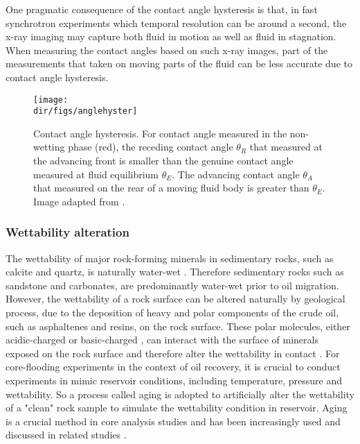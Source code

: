 One pragmatic consequence of the contact angle hysteresis is that, in fast synchrotron experiments which temporal resolution can be around a second, the x-ray imaging may capture both fluid in motion as well as fluid in stagnation. When measuring the contact angles based on such x-ray images, part of the measurements that taken on moving parts of the fluid can be less accurate due to contact angle hysteresis. 

\begin{figure}[htbp]
  \centering
  \texttt{[image: \\dir/figs/anglehyster]}
  \caption{Contact angle hysteresis. For contact angle measured in the non-wetting phase (red), the receding contact angle $\theta_R$ that measured at the advancing front is smaller than the genuine contact angle measured at fluid equilibrium $\theta_E$. The advancing contact angle $\theta_A$ that measured on the rear of a moving fluid body is greater than $\theta_E$. Image adapted from \citet{kantzas2012fundamentals}.}
  \label{anglehyster}
\end{figure}

\subsubsection{Wettability alteration}
The wettability of major rock-forming minerals in sedimentary rocks, such as calcite and quartz, is naturally water-wet \citep{abdallah1986fundamentals}. Therefore sedimentary rocks such as sandstone and carbonates, are predominantly water-wet prior to oil migration. However, the wettability of a rock surface can be altered naturally by geological process, due to the deposition of heavy and polar components of the crude oil, such as asphaltenes and resins, on the rock surface. These polar molecules, either acidic-charged or basic-charged \citep{benner1941effect}, can interact with the surface of minerals exposed on the rock surface and therefore alter the wettability in contact \citep{crocker1988wettability}. For core-flooding experiments in the context of oil recovery, it is crucial to conduct experiments in mimic reservoir conditions, including temperature, pressure and wettability. So a process called aging is adopted to artificially alter the wettability of a "clean" rock sample to simulate the wettability condition in reservoir. Aging is a crucial method in core analysis studies and has been increasingly used and discussed in related studies \cite{anderson1986wettability,al2005wettability,kowalewski2003wettability}. 
